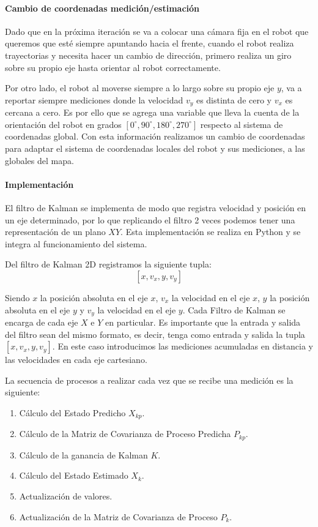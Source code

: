 \paragraph{Cambio de coordenadas medición/estimación} \mbox{} \vspace{8pt}

Dado que en la próxima iteración se va a colocar una cámara fija en el robot que queremos que esté siempre apuntando hacia el frente, cuando el robot realiza trayectorias y necesita hacer un cambio de dirección, primero realiza un giro sobre su propio eje hasta orientar al robot correctamente.

Por otro lado, el robot al moverse siempre a lo largo sobre su propio eje $y$, va a reportar siempre mediciones donde la velocidad $v_y$ es distinta de cero y $v_x$ es cercana a cero. Es por ello que se agrega una variable que lleva la cuenta de la orientación del robot en grados $[0^{\circ}, 90^{\circ}, 180^{\circ}, 270^{\circ}]$ respecto al sistema de coordenadas global. Con esta información realizamos un cambio de coordenadas para adaptar el sistema de coordenadas locales del robot y sus mediciones, a las globales del mapa.

\paragraph{Implementación} \mbox{} \vspace{8pt}

El filtro de Kalman se implementa de modo que registra velocidad y posición en un eje determinado, por lo que replicando el filtro 2 veces podemos tener una representación de un plano $XY$. Esta implementación se realiza en Python y se integra al funcionamiento del sistema.

Del filtro de Kalman 2D registramos la siguiente tupla:
$$ [x, v_x, y, v_y] $$

Siendo $x$ la posición absoluta en el eje $x$, $v_x$ la velocidad en el eje $x$, $y$ la posición absoluta en el eje $y$ y $v_y$ la velocidad en el eje $y$. Cada Filtro de Kalman se encarga de cada eje $X$ e $Y$ en particular.
Es importante que la entrada y salida del filtro sean del mismo formato, es decir, tenga como entrada y salida la tupla $[x, v_x, y, v_y]$. En este caso introducimos las mediciones acumuladas en distancia y las velocidades en cada eje cartesiano.

La secuencia de procesos a realizar cada vez que se recibe una medición es la siguiente:
\begin{enumerate}
    \item Cálculo del Estado Predicho $X_{kp}$.
    \item Cálculo de la Matriz de Covarianza de Proceso Predicha $P_{kp}$.
    \item Cálculo de la ganancia de Kalman $K$.
    \item Cálculo del Estado Estimado $X_k$.
    \item Actualización de valores.
    \item Actualización de la Matriz de Covarianza de Proceso $P_k$.
\end{enumerate}

